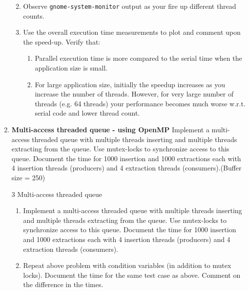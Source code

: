 \documentclass{sem5}
\begin{document}
\begin{enumerate}
\begin{enumerate}
\begin{center}
\end{center}
\item Observe \texttt{gnome-system-monitor} output as your fire up different thread counts.

\item Use the overall execution time measurements to plot and comment upon the speed-up. Verify that:
\begin{enumerate}
\item Parallel execution time is more compared to the serial time when the application size is small.
\item For large application size, initially the speedup increases as you increase the number of threads. However, for very large number of threads (e.g. 64 threads) your performance becomes much worse w.r.t. serial code and lower thread count.

\end{enumerate}
\end{enumerate}

\item \textbf{Multi-access threaded queue - using OpenMP}
Implement a multi-access threaded queue with multiple threads inserting and multiple threads extracting from the queue. Use mutex-locks to synchronize access to this queue. Document the time for 1000 insertion and 1000 extractions each with 4 insertion threads (producers) and 4 extraction threads (consumers).(Buffer size = 250)
\end{enumerate}

\begin{itemize}
\item[3] Multi-access threaded queue
\begin{enumerate}
\item Implement a multi-access threaded queue with multiple threads inserting and multiple threads extracting from the queue. Use mutex-locks to synchronize access to this queue. Document the time for 1000 insertion and 1000 extractions each with 4 insertion threads (producers) and 4 extraction threads (consumers).

\item Repeat above problem with condition variables (in addition to mutex locks). Document the time for the same test case as above. Comment on the difference in the times.

\end{enumerate}
\end{itemize}
\end{document}
